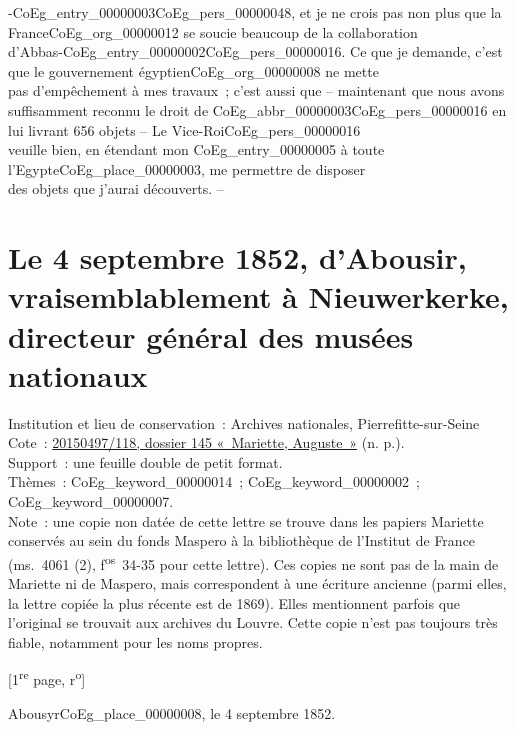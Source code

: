 \documentclass{book}
\begin{document}
{-\gls{CoEg_entry_00000003}\gls{CoEg_pers_00000048}, et je ne crois pas non plus que la France\gls{CoEg_org_00000012} se soucie beaucoup de la collaboration\\
d’Abbas-\Gls{CoEg_entry_00000002}\gls{CoEg_pers_00000016}. Ce que je demande, c’est que le gouvernement égyptien\gls{CoEg_org_00000008} ne mette\\
pas d’empêchement à mes travaux~; c’est aussi que – maintenant que nous avons\\
suffisamment reconnu le droit de \gls{CoEg_abbr_00000003}\gls{CoEg_pers_00000016} en lui livrant 656 objets – Le Vice-Roi\gls{CoEg_pers_00000016}\\
veuille bien, en étendant mon \gls{CoEg_entry_00000005} à toute l’Egypte\gls{CoEg_place_00000003}, me permettre de disposer\\
des objets que j’aurai découverts. –}

\hypertarget{CoEg_Mariette_1852-09-04}{}
\section*{Le 4 septembre 1852, d’Abousir, vraisemblablement à Nieuwerkerke, directeur général des musées nationaux}
{\footnotesize \noindent Institution et lieu de conservation~: Archives nationales, Pierrefitte-sur-Seine\\
Cote~: \hyperlink{CoEg_Mariette_ms_001}{20150497/118, dossier 145 «~Mariette, Auguste~»} (n. p.).\\
Support~: une feuille double de petit format.\\
Thèmes~: \gls{CoEg_keyword_00000014}~; \gls{CoEg_keyword_00000002}~; \gls{CoEg_keyword_00000007}.\\
Note~: une copie non datée de cette lettre se trouve dans les papiers Mariette conservés au sein du fonds Maspero à la bibliothèque de l’Institut de France (ms.~4061 (2), f\textsuperscript{os}~34-35 pour cette lettre). Ces copies ne sont pas de la main de Mariette ni de Maspero, mais correspondent à une écriture ancienne (parmi elles, la lettre copiée la plus récente est de 1869). Elles mentionnent parfois que l’original se trouvait aux archives du Louvre. Cette copie n’est pas toujours très fiable, notamment pour les noms propres.
\begin{center} {[1\textsuperscript{re} page, r\textsuperscript{o}]}\end{center}}
\begin{flushright}Abousyr\gls{CoEg_place_00000008}, le 4 septembre 1852.\end{flushright}
\end{document}
